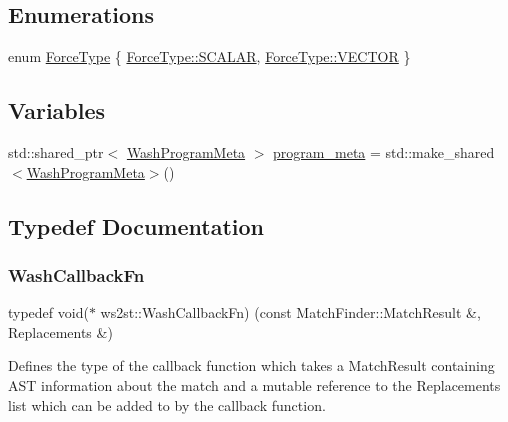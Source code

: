 \subsection*{Enumerations}
\begin{DoxyCompactItemize}
\item 
enum \mbox{\hyperlink{namespacews2st_a6f0a66f31a77eae4630693b8d4d27a05}{Force\+Type}} \{ \mbox{\hyperlink{namespacews2st_a6f0a66f31a77eae4630693b8d4d27a05a8f3d9a4b6a7b7f2c7afa61ca113d0db9}{Force\+Type\+::\+S\+C\+A\+L\+AR}}, 
\mbox{\hyperlink{namespacews2st_a6f0a66f31a77eae4630693b8d4d27a05a87752381b583740610f1dfeb07fdad7e}{Force\+Type\+::\+V\+E\+C\+T\+OR}}
 \}
\end{DoxyCompactItemize}
\subsection*{Variables}
\begin{DoxyCompactItemize}
\item 
std\+::shared\+\_\+ptr$<$ \mbox{\hyperlink{structws2st_1_1WashProgramMeta}{Wash\+Program\+Meta}} $>$ \mbox{\hyperlink{namespacews2st_ab3effe8d87dc3f3df0533a3cdcf136e4}{program\+\_\+meta}} = std\+::make\+\_\+shared$<$\mbox{\hyperlink{structws2st_1_1WashProgramMeta}{Wash\+Program\+Meta}}$>$()
\end{DoxyCompactItemize}


\subsection{Typedef Documentation}
\mbox{\label{namespacews2st_a682dfda40d8282c7e579a7b826a7d861}} 
\subsubsection{\texorpdfstring{Wash\+Callback\+Fn}{WashCallbackFn}}
{\footnotesize\ttfamily typedef void($\ast$  ws2st\+::\+Wash\+Callback\+Fn) (const Match\+Finder\+::\+Match\+Result \&, Replacements \&)}



Defines the type of the callback function which takes a Match\+Result containing A\+ST information about the match and a mutable reference to the Replacements list which can be added to by the callback function. 

\mbox{\label{namespacews2st_a77544d74f310dc9ec5c11bffa3ea77b6}} 
